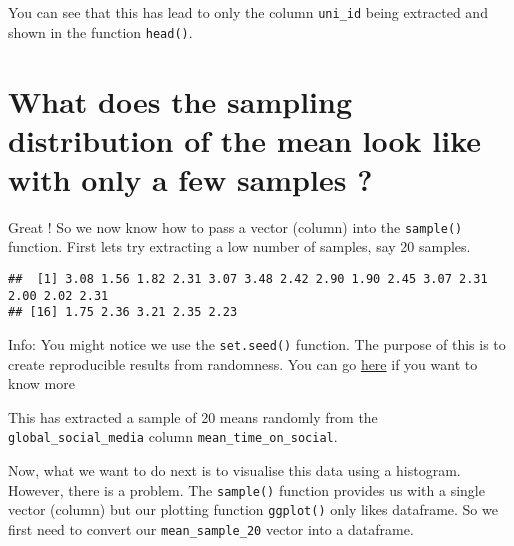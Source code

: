 \documentclass[
]{book}
\newenvironment{Shaded}{\begin{snugshade}}{\end{snugshade}}
\newcommand{\AttributeTok}[1]{\textcolor[rgb]{0.13,0.29,0.53}{#1}}
\newcommand{\CommentTok}[1]{\textcolor[rgb]{0.56,0.35,0.01}{\textit{#1}}}
\newcommand{\DecValTok}[1]{\textcolor[rgb]{0.00,0.00,0.81}{#1}}
\newcommand{\FunctionTok}[1]{\textcolor[rgb]{0.13,0.29,0.53}{\textbf{#1}}}
\newcommand{\NormalTok}[1]{#1}
\newcommand{\OtherTok}[1]{\textcolor[rgb]{0.56,0.35,0.01}{#1}}
\newcommand{\SpecialCharTok}[1]{\textcolor[rgb]{0.81,0.36,0.00}{\textbf{#1}}}
\begin{document}
You can see that this has lead to only the column \texttt{uni\_id} being extracted and shown in the function \texttt{head()}.

\section{What does the sampling distribution of the mean look like with only a few samples ?}\label{what-does-the-sampling-distribution-of-the-mean-look-like-with-only-a-few-samples}

Great ! So we now know how to pass a vector (column) into the \texttt{sample()} function. First lets try extracting a low number of samples, say 20 samples.

\begin{Shaded}
\end{Shaded}

\begin{verbatim}
##  [1] 3.08 1.56 1.82 2.31 3.07 3.48 2.42 2.90 1.90 2.45 3.07 2.31 2.00 2.02 2.31
## [16] 1.75 2.36 3.21 2.35 2.23
\end{verbatim}

Info: You might notice we use the \texttt{set.seed()} function. The purpose of this is to create reproducible results from randomness. You can go \href{https://www.statology.org/set-seed-in-r/}{here} if you want to know more

This has extracted a sample of 20 means randomly from the \texttt{global\_social\_media} column \texttt{mean\_time\_on\_social}.

Now, what we want to do next is to visualise this data using a histogram. However, there is a problem. The \texttt{sample()} function provides us with a single vector (column) but our plotting function \texttt{ggplot()} only likes dataframe. So we first need to convert our \texttt{mean\_sample\_20} vector into a dataframe.
\end{document}
